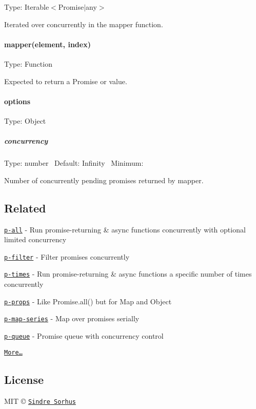 Type\+: {\ttfamily Iterable$<$Promise$\vert$any$>$}

Iterated over concurrently in the {\ttfamily mapper} function.

\paragraph*{mapper(element, index)}

Type\+: {\ttfamily Function}

Expected to return a {\ttfamily Promise} or value.

\paragraph*{options}

Type\+: {\ttfamily Object}

\subparagraph*{concurrency}

Type\+: {\ttfamily number}~\newline
 Default\+: {\ttfamily Infinity}~\newline
 Minimum\+: {}

Number of concurrently pending promises returned by {\ttfamily mapper}.

\subsection*{Related}


\begin{DoxyItemize}
\item \href{https://github.com/sindresorhus/p-all}{\tt p-\/all} -\/ Run promise-\/returning \& async functions concurrently with optional limited concurrency
\item \href{https://github.com/sindresorhus/p-filter}{\tt p-\/filter} -\/ Filter promises concurrently
\item \href{https://github.com/sindresorhus/p-times}{\tt p-\/times} -\/ Run promise-\/returning \& async functions a specific number of times concurrently
\item \href{https://github.com/sindresorhus/p-props}{\tt p-\/props} -\/ Like {\ttfamily Promise.\+all()} but for {\ttfamily Map} and {\ttfamily Object}
\item \href{https://github.com/sindresorhus/p-map-series}{\tt p-\/map-\/series} -\/ Map over promises serially
\item \href{https://github.com/sindresorhus/p-queue}{\tt p-\/queue} -\/ Promise queue with concurrency control
\item \href{https://github.com/sindresorhus/promise-fun}{\tt More…}
\end{DoxyItemize}

\subsection*{License}

M\+IT © \href{https://sindresorhus.com}{\tt Sindre Sorhus} 